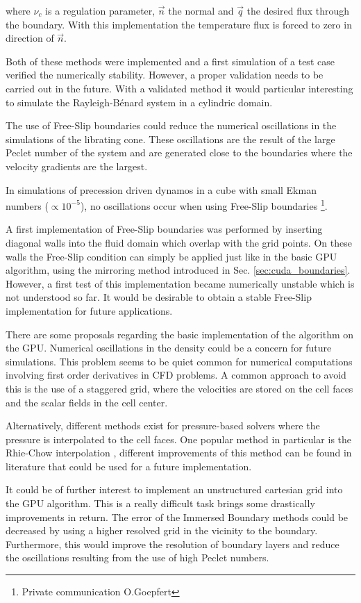 where $\nu_c$ is a regulation parameter, $\vec{n}$ the normal and $\vec{q}$  the desired flux through the boundary.
With this implementation the temperature flux is forced to zero in direction of $\vec{n}$.

Both of these methods were implemented and a first simulation of a test case verified the numerically stability.
However, a proper validation needs to be carried out in the future.
With a validated method it would  particular interesting to simulate
the Rayleigh-B\'{e}nard system in a cylindric domain.


The use of Free-Slip boundaries could reduce the numerical oscillations in the simulations of the librating cone.
These oscillations are the result of the large Peclet number of the system and are generated
close to the boundaries where the velocity gradients are the largest.

In simulations of precession driven dynamos in a cube with small Ekman numbers ($\propto 10^{-5}$),
no oscillations occur when using Free-Slip boundaries \footnote{Private communication O.Goepfert}.

A first implementation of Free-Slip boundaries was performed
by inserting diagonal walls into the fluid domain which overlap with the grid points.
On these walls the Free-Slip condition can simply be applied just like in the basic GPU algorithm,
using the mirroring method introduced in Sec. \ref{sec:cuda_boundaries}.
However, a first test of this implementation became numerically unstable which is not understood so far.
It would be desirable to obtain a stable Free-Slip implementation for future applications.

There are some proposals regarding the basic implementation of the algorithm on the GPU.
Numerical oscillations in the density could be a concern for future simulations.
This problem seems to be quiet common for numerical computations involving first order derivatives in CFD problems.
A common approach to avoid this is the use of a staggered grid, where the velocities
are stored on the cell faces and the scalar fields in the cell center.

Alternatively, different methods exist for pressure-based solvers where the pressure is interpolated to the cell faces.
One popular method in particular is the Rhie-Chow interpolation \citep{uiae},
different improvements of this method can be found in literature that could be used for a future implementation.

It could be of further interest to implement an unstructured cartesian grid into the GPU algorithm.
This is a really difficult task brings some drastically improvements in return.
The error of the Immersed Boundary methods could be decreased by using a higher resolved grid in the vicinity to the boundary.
Furthermore, this would improve the resolution of boundary layers  and reduce the oscillations resulting from the use of high Peclet numbers.

